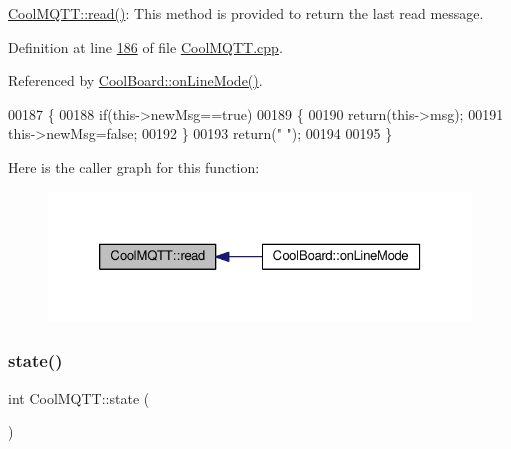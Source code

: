 \hyperlink{class_cool_m_q_t_t_ae3c18f6ae9723746d32765f1c8f176ca}{Cool\+M\+Q\+T\+T\+::read()}\+: This method is provided to return the last read message. 

Definition at line \hyperlink{_cool_m_q_t_t_8cpp_source_l00186}{186} of file \hyperlink{_cool_m_q_t_t_8cpp_source}{Cool\+M\+Q\+T\+T.\+cpp}.



Referenced by \hyperlink{_cool_board_8cpp_source_l00097}{Cool\+Board\+::on\+Line\+Mode()}.


\begin{DoxyCode}
00187 \{   
00188     \textcolor{keywordflow}{if}(this->newMsg==\textcolor{keyword}{true})
00189     \{
00190         \textcolor{keywordflow}{return}(this->msg);
00191         this->newMsg=\textcolor{keyword}{false};
00192     \}
00193     \textcolor{keywordflow}{return}(\textcolor{stringliteral}{" "});
00194 
00195 \}
\end{DoxyCode}
Here is the caller graph for this function\+:
\nopagebreak
\begin{figure}[H]
\begin{center}
\leavevmode
\includegraphics[width=326pt]{class_cool_m_q_t_t_ae3c18f6ae9723746d32765f1c8f176ca_icgraph}
\end{center}
\end{figure}
\mbox{\label{class_cool_m_q_t_t_a5d003307eff78efbd585e42b43b72b6d}} 
\subsubsection{\texorpdfstring{state()}{state()}}
{\footnotesize\ttfamily int Cool\+M\+Q\+T\+T\+::state (\begin{DoxyParamCaption}{ }\end{DoxyParamCaption})}

